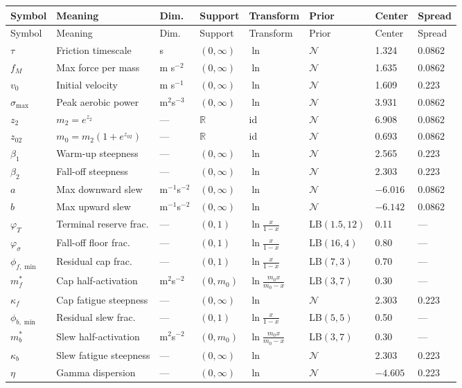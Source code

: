 \documentclass[11pt]{article}
\begin{document}
\begin{small}
\begin{longtable}{@{}p{1.7cm}p{3.4cm}p{0.9cm}p{1.4cm}p{1.6cm}p{2.1cm}p{1.0cm}p{0.9cm}@{}}
\toprule
Symbol & Meaning & Dim. & Support & Transform & Prior & Center & Spread \\
\midrule
\endfirsthead
\toprule
Symbol & Meaning & Dim. & Support & Transform & Prior & Center & Spread \\
\midrule
\endhead
$\tau$ & Friction timescale & s & $(0, \infty)$ & $\ln$ & $\mathcal{N}$ & 1.324 & 0.0862 \\
$f_M$ & Max force per mass & m s$^{-2}$ & $(0, \infty)$ & $\ln$ & $\mathcal{N}$ & 1.635 & 0.0862 \\
$v_0$ & Initial velocity & m s$^{-1}$ & $(0, \infty)$ & $\ln$ & $\mathcal{N}$ & 1.609 & 0.223 \\
$\sigma_{\max}$ & Peak aerobic power & m$^2$s$^{-3}$ & $(0, \infty)$ & $\ln$ & $\mathcal{N}$ & 3.931 & 0.0862 \\
$z_2$ & $m_2 = e^{z_2}$ & --- & $\mathbb{R}$ & id & $\mathcal{N}$ & 6.908 & 0.0862 \\
$z_{02}$ & $m_0 = m_2(1+e^{z_{02}})$ & --- & $\mathbb{R}$ & id & $\mathcal{N}$ & 0.693 & 0.0862 \\
$\beta_1$ & Warm-up steepness & --- & $(0, \infty)$ & $\ln$ & $\mathcal{N}$ & 2.565 & 0.223 \\
$\beta_2$ & Fall-off steepness & --- & $(0, \infty)$ & $\ln$ & $\mathcal{N}$ & 2.303 & 0.223 \\
$a$ & Max downward slew & m$^{-1}$s$^{-2}$ & $(0, \infty)$ & $\ln$ & $\mathcal{N}$ & $-6.016$ & 0.0862 \\
$b$ & Max upward slew & m$^{-1}$s$^{-2}$ & $(0, \infty)$ & $\ln$ & $\mathcal{N}$ & $-6.142$ & 0.0862 \\
$\varphi_T$ & Terminal reserve frac. & --- & $(0, 1)$ & $\ln\!\frac{x}{1-x}$ & LB$(1.5, 12)$ & 0.11 & --- \\
$\varphi_\sigma$ & Fall-off floor frac. & --- & $(0, 1)$ & $\ln\!\frac{x}{1-x}$ & LB$(16, 4)$ & 0.80 & --- \\
$\phi_{f,\min}$ & Residual cap frac. & --- & $(0, 1)$ & $\ln\!\frac{x}{1-x}$ & LB$(7, 3)$ & 0.70 & --- \\
$m_f^*$ & Cap half-activation & m$^2$s$^{-2}$ & $(0, m_0)$ & $\ln\!\frac{m_0 x}{m_0 - x}$ & LB$(3, 7)$ & 0.30 & --- \\
$\kappa_f$ & Cap fatigue steepness & --- & $(0, \infty)$ & $\ln$ & $\mathcal{N}$ & 2.303 & 0.223 \\
$\phi_{b,\min}$ & Residual slew frac. & --- & $(0, 1)$ & $\ln\!\frac{x}{1-x}$ & LB$(5, 5)$ & 0.50 & --- \\
$m_b^*$ & Slew half-activation & m$^2$s$^{-2}$ & $(0, m_0)$ & $\ln\!\frac{m_0 x}{m_0 - x}$ & LB$(3, 7)$ & 0.30 & --- \\
$\kappa_b$ & Slew fatigue steepness & --- & $(0, \infty)$ & $\ln$ & $\mathcal{N}$ & 2.303 & 0.223 \\
$\eta$ & Gamma dispersion & --- & $(0, \infty)$ & $\ln$ & $\mathcal{N}$ & $-4.605$ & 0.223 \\
\bottomrule
\end{longtable}
\end{small}
\end{document}
